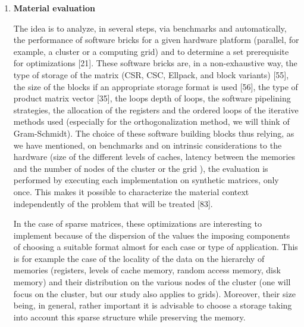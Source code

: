 \begin{enumerate}

\item\textbf{Material evaluation}

The idea is to analyze, in several steps, via benchmarks and automatically, the performance of software bricks for a given hardware platform (parallel, for example, a cluster or a computing grid) and to determine a set prerequisite for optimizations [21]. These software bricks are, in a non-exhaustive way, the type of storage of the matrix (CSR, CSC, Ellpack, and block variants) [55], the size of the blocks if an appropriate storage format is used [56], the type of product matrix vector [35], the loops depth of loops, the software pipelining strategies, the allocation of the registers and the ordered loops of the iterative methods used (especially for the orthogonalization method, we will think of Gram-Schmidt). The choice of these software building blocks thus relying, as we have mentioned, on benchmarks and on intrinsic considerations to the hardware (size of the different levels of caches, latency between the memories and the number of nodes of the cluster or the grid ), the evaluation is performed by executing each implementation on synthetic matrices, only once. This makes it possible to characterize the material context independently of the problem that will be treated [83].


In the case of sparse matrices, these optimizations are interesting to implement because of the dispersion of the values the imposing components of choosing a suitable format almost for each case or type of application. This is for example the case of the locality of the data on the hierarchy of memories (registers, levels of cache memory, random access memory, disk memory) and their distribution on the various nodes of the cluster (one will focus on the cluster, but our study also applies to grids). Moreover, their size being, in general, rather important it is advisable to choose a storage taking into account this sparse structure while preserving the memory.


\end{enumerate}
